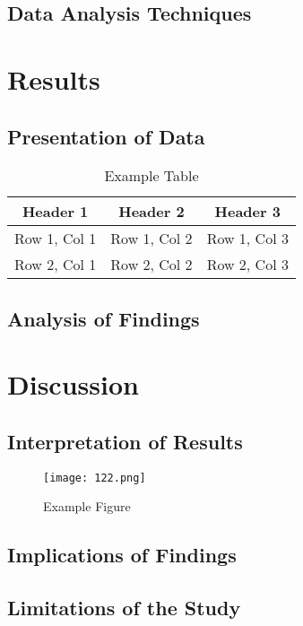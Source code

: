 \documentclass[12pt]{report}
\begin{document}
\section{Data Analysis Techniques}
\lipsum[1] %

\chapter{Results}
\section{Presentation of Data}
\lipsum[1] %

\begin{table}[h]
\centering
\begin{tabular}{|c|c|c|}
\hline
Header 1 & Header 2 & Header 3 \\
\hline
Row 1, Col 1 & Row 1, Col 2 & Row 1, Col 3 \\
Row 2, Col 1 & Row 2, Col 2 & Row 2, Col 3 \\
\hline
\end{tabular}
\caption{Example Table}
\label{tab:example}
\end{table}

\section{Analysis of Findings}
\lipsum[1] %

\chapter{Discussion}
\section{Interpretation of Results}
\lipsum[1] %


\begin{figure}[h]
\centering
\texttt{[image: 122.png]} %
\caption{Example Figure}
\label{fig:2}
\end{figure}

\section{Implications of Findings}
\lipsum[1] %
\section{Limitations of the Study}
\lipsum[1] %
\end{document}
